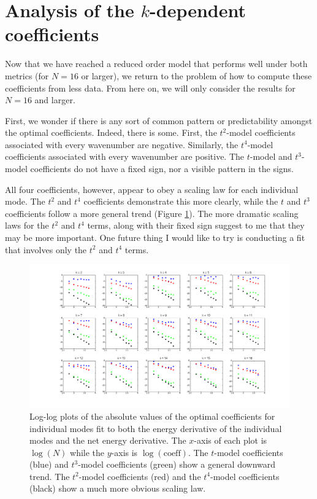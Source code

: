 \documentclass{article}
\begin{document}
\section{Analysis of the $k$-dependent coefficients}

Now that we have reached a reduced order model that performs well under both metrics (for $N=16$ or larger), we return to the problem of how to compute these coefficients from less data. From here on, we will only consider the results for $N=16$ and larger.

First, we wonder if there is any sort of common pattern or predictability amongst the optimal coefficients. Indeed, there is some. First, the $t^2$-model coefficients associated with every wavenumber are negative. Similarly, the $t^4$-model coefficients associated with every wavenumber are positive. The $t$-model and $t^3$-model coefficients do not have a fixed sign, nor a visible pattern in the signs.

All four coefficients, however, appear to obey a scaling law for each individual mode. The $t^2$ and $t^4$ coefficients demonstrate this more clearly, while the $t$ and $t^3$ coefficients follow a more general trend (Figure \ref{fig:k_scaling}). The more dramatic scaling laws for the $t^2$ and $t^4$ terms, along with their fixed sign suggest to me that they may be more important. One future thing I would like to try is conducting a fit that involves only the $t^2$ and $t^4$ terms.

\begin{figure}[h]
\includegraphics[width=\textwidth]{k_scaling_laws.png}
\caption{Log-log plots of the absolute values of the optimal coefficients for individual modes fit to both the energy derivative of the individual modes and the net energy derivative. The $x$-axis of each plot is $\log(N)$ while the $y$-axis is $\log(\text{coeff})$. The $t$-model coefficients (blue) and $t^3$-model coefficients (green) show a general downward trend. The $t^2$-model coefficients (red) and the $t^4$-model coefficients (black) show a much more obvious scaling law.}\label{fig:k_scaling}
\end{figure}
\end{document}
